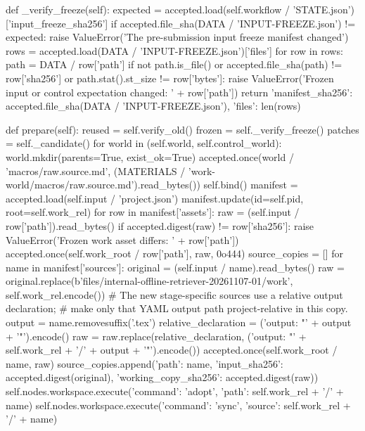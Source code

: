    def _verify_freeze(self):
        expected = accepted.load(self.workflow / 'STATE.json')['input_freeze_sha256']
        if accepted.file_sha(DATA / 'INPUT-FREEZE.json') != expected:
            raise ValueError('The pre-submission input freeze manifest changed')
        rows = accepted.load(DATA / 'INPUT-FREEZE.json')['files']
        for row in rows:
            path = DATA / row['path']
            if not path.is_file() or accepted.file_sha(path) != row['sha256'] or path.stat().st_size != row['bytes']:
                raise ValueError('Frozen input or control expectation changed: ' + row['path'])
        return {'manifest_sha256': accepted.file_sha(DATA / 'INPUT-FREEZE.json'), 'files': len(rows)}

    def prepare(self):
        reused = self.verify_old()
        frozen = self._verify_freeze()
        patches = self._candidate()
        for world in (self.world, self.control_world):
            world.mkdir(parents=True, exist_ok=True)
            accepted.once(world / 'macros/raw.source.md', (MATERIALS / 'work-world/macros/raw.source.md').read_bytes())
        self.bind()
        manifest = accepted.load(self.input / 'project.json')
        manifest.update(id=self.pid, root=self.work_rel)
        for row in manifest['assets']:
            raw = (self.input / row['path']).read_bytes()
            if accepted.digest(raw) != row['sha256']:
                raise ValueError('Frozen work asset differs: ' + row['path'])
            accepted.once(self.work_root / row['path'], raw, 0o444)
        source_copies = []
        for name in manifest['sources']:
            original = (self.input / name).read_bytes()
            raw = original.replace(b'files/internal-offline-retriever-20261107-01/work', self.work_rel.encode())
            # The new stage-specific sources use a relative output declaration;
            # make only that YAML output path project-relative in this copy.
            output = name.removesuffix('.tex')
            relative_declaration = ('output: "' + output + '"').encode()
            raw = raw.replace(relative_declaration, ('output: "' + self.work_rel + '/' + output + '"').encode())
            accepted.once(self.work_root / name, raw)
            source_copies.append({'path': name, 'input_sha256': accepted.digest(original),
                                  'working_copy_sha256': accepted.digest(raw)})
            self.nodes.workspace.execute({'command': 'adopt', 'path': self.work_rel + '/' + name})
            self.nodes.workspace.execute({'command': 'sync', 'source': self.work_rel + '/' + name})
